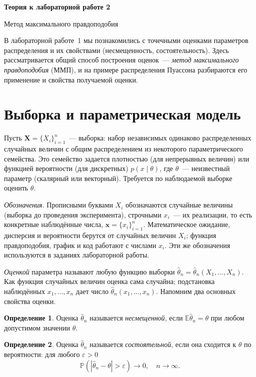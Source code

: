 \documentclass[a4paper,12pt]{article}
\theoremstyle{definition}
\newtheorem{definition}{Определение}
\theoremstyle{plain}
\theoremstyle{remark}
\newcommand{\E}{\mathbb{E}}
\renewcommand{\P}{\mathbb{P}}
\begin{document}
\begin{center}
  {\Large\bfseries Теория к лабораторной работе 2\par}
  {\large Метод максимального правдоподобия\par}
\end{center}

В лабораторной работе~1 мы познакомились с точечными оценками параметров распределения и их свойствами (несмещенность, состоятельность). Здесь рассматривается общий способ построения оценок~--- \emph{метод максимального правдоподобия} (ММП), и на примере распределения Пуассона разбираются его применение и свойства получаемой оценки.

\section{Выборка и параметрическая модель}

Пусть $\mathbf{X}=\{X_i\}_{i=1}^n$~--- выборка: набор независимых одинаково распределенных случайных величин с общим распределением из некоторого параметрического семейства. Это семейство задается плотностью (для непрерывных величин) или функцией вероятности (для дискретных) $p(x\mid\theta)$, где $\theta$~--- неизвестный параметр (скалярный или векторный). Требуется по наблюдаемой выборке оценить $\theta$.

\emph{Обозначения.} Прописными буквами $X_i$ обозначаются случайные величины (выборка до проведения эксперимента), строчными $x_i$~--- их реализации, то есть конкретные наблюдённые числа, $\mathbf{x}=\{x_i\}_{i=1}^n$. Математическое ожидание, дисперсия и вероятности берутся от случайных величин $X_i$; функция правдоподобия, график и код работают с числами $x_i$. Эти же обозначения используются в заданиях лабораторной работы.

\emph{Оценкой} параметра называют любую функцию выборки $\hat\theta_n=\hat\theta_n(X_1,\dots,X_n)$. Как функция случайных величин оценка сама случайна; подстановка наблюдённых $x_1,\dots,x_n$ дает число $\hat\theta_n(x_1,\dots,x_n)$. Напомним два основных свойства оценки.

\begin{definition}
Оценка $\hat\theta_n$ называется \emph{несмещенной}, если $\E\hat\theta_n=\theta$ при любом допустимом значении $\theta$.
\end{definition}

\begin{definition}
Оценка $\hat\theta_n$ называется \emph{состоятельной}, если она сходится к $\theta$ по вероятности: для любого $\varepsilon>0$
$$\P\left(|\hat\theta_n-\theta|>\varepsilon\right)\to0,\quad n\to\infty.$$
\end{definition}
\end{document}
